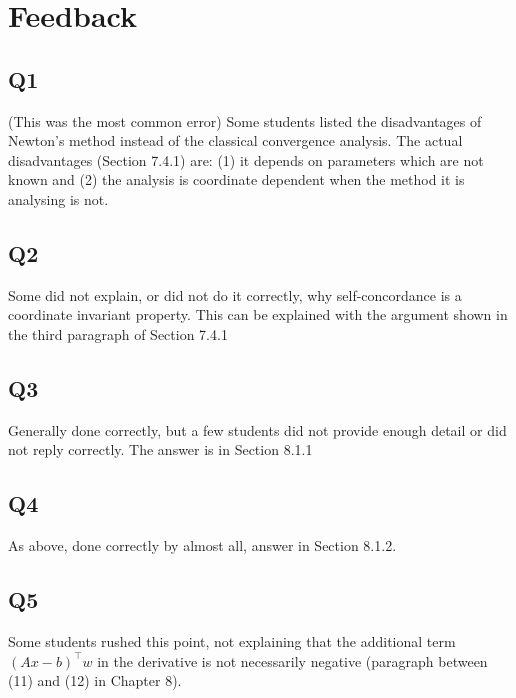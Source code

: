 \newpage

\section*{Feedback}

\subsection*{Q1}
(This was the most common error) Some students listed the disadvantages of Newton's method instead of the classical convergence analysis. The actual disadvantages (Section 7.4.1) are: (1) it depends on parameters which are not known and (2) the analysis is coordinate dependent when the method it is analysing is not.

\subsection*{Q2}
Some did not explain, or did not do it correctly, why self-concordance is a coordinate invariant property. This can be explained with the argument shown in the third paragraph of Section 7.4.1

\subsection*{Q3}
Generally done correctly, but a few students did not provide enough detail or did not reply correctly. The answer is in Section 8.1.1

\subsection*{Q4}
As above, done correctly by almost all, answer in Section 8.1.2.

\subsection*{Q5}
Some students rushed this point, not explaining that the additional term $(Ax-b)^\top w$ in the derivative is not necessarily negative (paragraph between (11) and (12) in Chapter 8).

